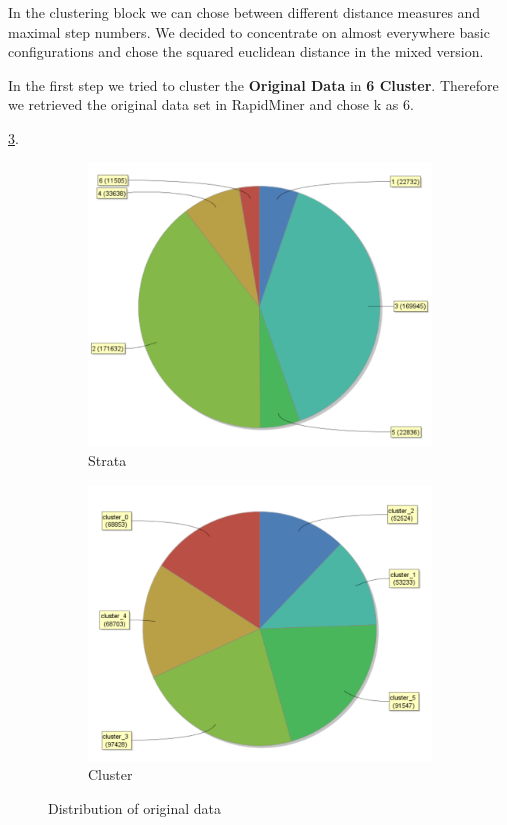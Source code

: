 In the clustering block we can chose between different distance measures and maximal step numbers. We decided to concentrate on almost everywhere basic configurations and chose the squared euclidean distance in the mixed version.

In the first step we tried to cluster the \textbf{Original Data} in \textbf{6 Cluster}. Therefore we retrieved the original data set in RapidMiner and chose k as 6.

\ref{fig:OrgDist}. 
\begin{figure}[!htbp]
\centering
\begin{subfigure}{.5\textwidth}
  \centering
  \includegraphics[width=.8\linewidth]{ClusterOrigRapidStrata.PNG}
  \caption{Strata}
  \label{fig:OrgSt}
\end{subfigure}%
\begin{subfigure}{.5\textwidth}
  \centering
  \includegraphics[width=.8\linewidth]{ClusterOrigRapidCluster.PNG}
  \caption{Cluster}
  \label{fig:OrgCl}
\end{subfigure}
\caption{Distribution of original data}
\label{fig:OrgDist}
\end{figure}

